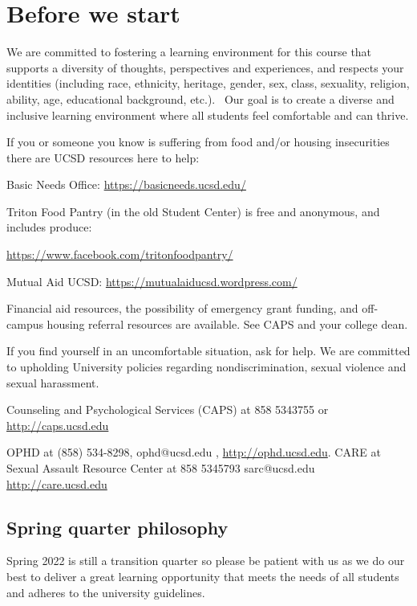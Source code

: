 

\section*{Before we start}

We are committed to fostering a learning environment for this course that supports a diversity of thoughts, 
perspectives and experiences, and respects your identities (including race, ethnicity, heritage, gender, sex, 
class, sexuality, religion, ability, age, educational background, etc.).  
Our goal is to create a diverse and inclusive learning environment where all students feel comfortable and can thrive. 

If you or someone you know is suffering from food and/or housing insecurities 
there are UCSD resources here to help:

Basic Needs Office: \href{https://basicneeds.ucsd.edu/}{https://basicneeds.ucsd.edu/}

Triton Food Pantry (in the old Student Center)
is free and anonymous, and includes produce: 

\href{https://www.facebook.com/tritonfoodpantry/}{https://www.facebook.com/tritonfoodpantry/}

Mutual Aid UCSD: \href{https://mutualaiducsd.wordpress.com/}{https://mutualaiducsd.wordpress.com/}

Financial aid resources, the possibility of emergency grant funding, and off-campus housing referral 
resources are available. See CAPS and your college dean.

If you find yourself in an uncomfortable situation, ask for help. 
We are committed to upholding University policies regarding nondiscrimination, sexual violence and sexual harassment.

Counseling and Psychological Services (CAPS) at 858 5343755 or \href{http://caps.ucsd.edu}{http://caps.ucsd.edu}


OPHD at (858) 534-8298, ophd@ucsd.edu , \href{http://ophd.ucsd.edu}{http://ophd.ucsd.edu}. 
CARE at Sexual Assault Resource Center at 858 5345793 sarc@ucsd.edu \href{http://care.ucsd.edu}{http://care.ucsd.edu}

\subsection*{Spring quarter philosophy}
Spring 2022 is still a transition quarter so please be patient with us as we do our best 
to deliver a great learning opportunity that meets the needs of all students and adheres to the university guidelines. 


